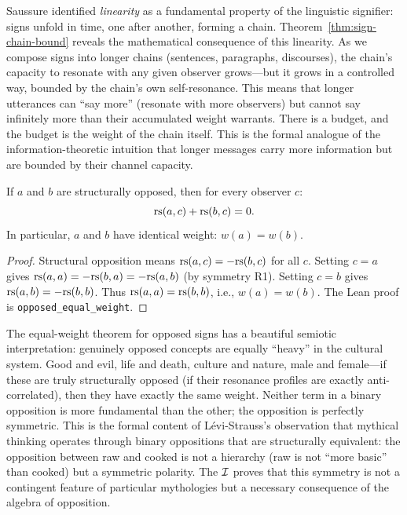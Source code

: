 \begin{interpretation}
Saussure identified \emph{linearity} as a fundamental property of the linguistic signifier: signs unfold in time, one after another, forming a chain. Theorem~\ref{thm:sign-chain-bound} reveals the mathematical consequence of this linearity. As we compose signs into longer chains (sentences, paragraphs, discourses), the chain's capacity to resonate with any given observer grows---but it grows in a controlled way, bounded by the chain's own self-resonance. This means that longer utterances can ``say more'' (resonate with more observers) but cannot say infinitely more than their accumulated weight warrants. There is a budget, and the budget is the weight of the chain itself. This is the formal analogue of the information-theoretic intuition that longer messages carry more information but are bounded by their channel capacity.
\end{interpretation}

\begin{theorem}
\label{thm:differential-opposition}
If $a$ and $b$ are structurally opposed, then for every observer $c$:
\[
  \mathrm{rs}(a, c) + \mathrm{rs}(b, c) = 0.
\]
In particular, $a$ and $b$ have identical weight: $w(a) = w(b)$.
\end{theorem}

\begin{proof}
Structural opposition means $\mathrm{rs}(a, c) = -\mathrm{rs}(b, c)$ for all $c$. Setting $c = a$ gives $\mathrm{rs}(a, a) = -\mathrm{rs}(b, a) = -\mathrm{rs}(a, b)$ (by symmetry R1). Setting $c = b$ gives $\mathrm{rs}(a, b) = -\mathrm{rs}(b, b)$. Thus $\mathrm{rs}(a, a) = \mathrm{rs}(b, b)$, i.e., $w(a) = w(b)$. The Lean proof is \texttt{opposed\_equal\_weight}.
\end{proof}

\begin{interpretation}
The equal-weight theorem for opposed signs has a beautiful semiotic interpretation: genuinely opposed concepts are equally ``heavy'' in the cultural system. Good and evil, life and death, culture and nature, male and female---if these are truly structurally opposed (if their resonance profiles are exactly anti-correlated), then they have exactly the same weight. Neither term in a binary opposition is more fundamental than the other; the opposition is perfectly symmetric. This is the formal content of L\'evi-Strauss's observation that mythical thinking operates through binary oppositions that are structurally equivalent: the opposition between raw and cooked is not a hierarchy (raw is not ``more basic'' than cooked) but a symmetric polarity. The $\mathcal{I}$ proves that this symmetry is not a contingent feature of particular mythologies but a necessary consequence of the algebra of opposition.
\end{interpretation}

